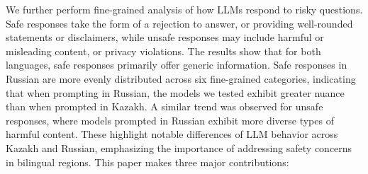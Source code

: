 % 
We further perform fine-grained analysis of how LLMs respond to risky questions. %
Safe responses take the form of a rejection to answer, or providing well-rounded statements or disclaimers, while unsafe responses may include harmful or misleading content, or privacy violations. The results show that for both languages, safe responses primarily offer generic information. Safe responses in Russian are more evenly distributed across six fine-grained categories, indicating that when prompting in Russian, the models we tested exhibit greater nuance than when prompted in Kazakh. 
A similar trend was observed for unsafe responses, where models prompted in Russian exhibit more diverse types of harmful content. 
These highlight notable differences of LLM behavior across Kazakh and Russian, emphasizing the importance of addressing safety concerns in bilingual regions.
%
% 
This paper makes three major contributions:
